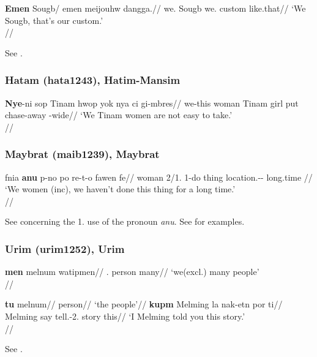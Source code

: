 \ex 
\begingl
\gla \textbf{Emen} Sougb/ emen meijouhw dangga.//
\glb we.\Excl{} Sougb we.\Excl{} custom like.that//
\glft `We Sougb, that's our custom.' \\\citep[274, (40)]{reesink2002sougb}//
\endgl
\xe 

See \citet[200, 269f., 274]{reesink2002sougb}.

\subsubsection{Hatam (hata1243), Hatim-Mansim}

\ex \begingl
\gla \textbf{Nye}-ni sop Tinam hwop yok nya ci gi-mbres//
\glb we-this woman Tinam girl put \Pl{} chase-away \Nmlz{}-wide//
\glft `We Tinam women are not easy to take.'\\\citep[195, (72)]{reesink1999}//
\endgl
\xe 


\subsubsection{Maybrat (maib1239), Maybrat}

\ex
\begingl
\gla fnia \textbf{anu} p-no po re-t-o fawen fe//
\glb woman 2\Pl/1\Pl.\Incl{} 1\Pl-do thing location.\Spec-\Prox-\Unmark{} long.time \Neg{}//
\glft `We women (inc), we haven't done this thing for a long time.'\\\citep[158, (99)]{dol2007}//
\endgl
\xe

See \citet[64, fn. 5]{dol2007} concerning the 1\Pl.\Incl{} use of the pronoun \emph{anu}.
See \citet[141, 158, 172, (281)]{dol2007} for examples.

\subsubsection{Urim (urim1252), Urim}

\ex \begingl
\gla \textbf{men} melnum watipmen//
\Pl.\Excl{} person many//
\glft `we(excl.) many people'\\
\citep[123]{hemmilaeluoma1987}//
\endgl
\xe 

\pex
\a
\begingl
\gla \textbf{tu} melnum//
\Pl{} person//
\glft `the people'//
\endgl
\a \begingl
\gla \textbf{kupm} Melming la nak-etn por ti//
\Sg{} Melming say tell.\Real{}-2\Sg.\Obj{} story this//
\glft `I Melming told you this story.'\\
\citep[125]{hemmilaeluoma1987}//
\endgl
\xe

See \citet[123, 125]{hemmilaeluoma1987}.

